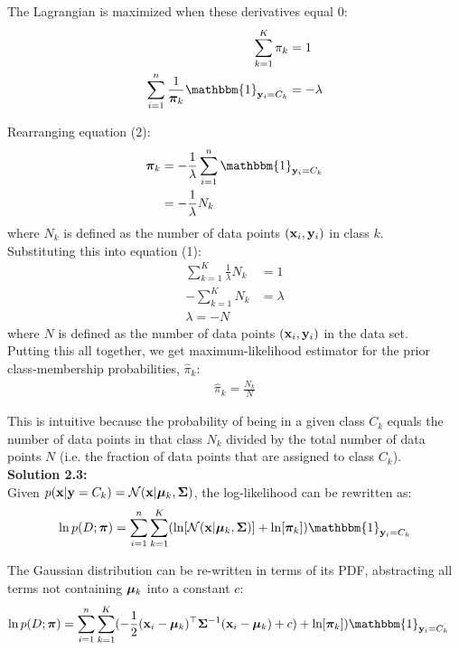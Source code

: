 \documentclass[submit]{harvardml}
\begin{document}
The Lagrangian is maximized when these derivatives equal 0:
\begin{align}
    \sum_{k=1}^{K}\pi_k &= 1\\
    \sum_{i=1}^{n} \frac{1}{\bpi_k} \mathbbm{1}_{\boldy_i = C_k} &= - \lambda
\end{align}

Rearranging equation (2):
\begin{align*}
    \bpi_k &= - \frac{1}{\lambda}\sum_{i=1}^{n} \mathbbm{1}_{\boldy_i = C_k}\\
    &= - \frac{1}{\lambda} N_k
\end{align*}
where $N_k$ is defined as the number of data points $(\mathbf{x}_i,
\mathbf{y}_i)$ in class $k$.\\

Substituting this into equation (1):
\begin{align*}
    \sum_{k=1}^{K} \frac{1}{\lambda} N_k &= 1\\
    - \sum_{k=1}^{K} N_k &= \lambda\\
    \lambda = -N
\end{align*}
where $N$ is defined as the number of data points $(\mathbf{x}_i,
\mathbf{y}_i)$ in the data set.\\

Putting this all together, we get maximum-likelihood estimator for the prior class-membership probabilities, $\hat \pi_k$:
\begin{align*}
    \hat \pi_k = \frac{N_k}{N}
\end{align*}

This is intuitive because the probability of being in a given class $C_k$ equals the number of data points in that class $N_k$ divided by the total number of data points $N$ (i.e. the fraction of data points that are assigned to class $C_k$).\\

\noindent\textbf{Solution 2.3:}\\
Given $p(\mathbf{x} | \mathbf{y} = C_k) = \mathcal{N}(\mathbf{x} |  \boldsymbol{\mu}_k, \mathbf{\Sigma})$, the log-likelihood can be rewritten as:
\begin{align*}
    \ln p(D ; \bpi) &= \sum_{i=1}^{n} \sum_{k=1}^{K} (\ln[\mathcal{N}(\boldx |  \bmu_k, \bSigma)] + \ln[\bpi_k]) \mathbbm{1}_{\boldy_i = C_k}\\
\end{align*}

The Gaussian distribution can be re-written in terms of its PDF, abstracting all terms not containing $\boldsymbol{\mu}_k$ into a constant $c$:
\begin{align*}
    \ln p(D ; \bpi) &= \sum_{i=1}^{n} \sum_{k=1}^{K} (-\frac{1}{2} (\boldx_i - \bmu_k)^{\top} \bSigma^{-1}(\boldx_i - \bmu_k) + c) + \ln[\bpi_k]) \mathbbm{1}_{\boldy_i = C_k}
\end{align*}
\end{document}
